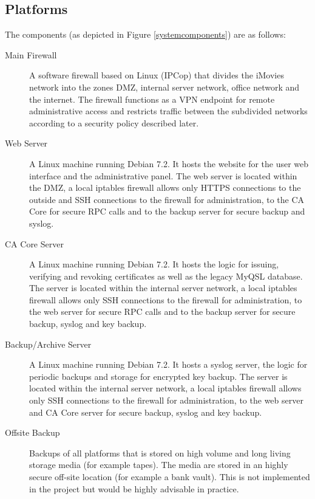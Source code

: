 \documentclass[a4paper, toc=index, 12pt, DIV14, twoside, BCOR2cm, headsepline, numbers=noenddot, bibliography=totoc]{report}
\begin{document}
\subsection{Platforms}
The components (as depicted in Figure \ref{systemcomponents}) are as follows:
\begin{description}
\item[Main Firewall ] A software firewall based on Linux (IPCop) that divides the iMovies network into the zones DMZ, internal server network, office network and the internet. The firewall functions as a VPN endpoint for remote administrative access and restricts traffic between the subdivided networks according to a security policy described later.

\item[Web Server ] A Linux machine running Debian 7.2. It hosts the website for the user web interface and the administrative panel. The web server is located within the DMZ, a local iptables firewall allows only HTTPS connections to the outside and SSH connections to the firewall for administration, to the CA Core for secure RPC calls and to the backup server for secure backup and syslog.

\item[CA Core Server ] A Linux machine running Debian 7.2. It hosts the logic for issuing, verifying and revoking certificates as well as the legacy MyQSL database. The server is located within the internal server network, a local iptables firewall allows only SSH connections to the firewall for administration, to the web server for secure RPC calls and to the backup server for secure backup, syslog and key backup.

\item[Backup/Archive Server ] A Linux machine running Debian 7.2. It hosts a syslog server, the logic for periodic backups and storage for encrypted key backup. The server is located within the internal server network, a local iptables firewall allows only SSH connections to the firewall for administration, to the web server and CA Core server for secure backup, syslog and key backup.

\item[Offsite Backup ] Backups of all platforms that is stored on high volume and long living storage media (for example tapes). The media are stored in an highly secure off-site location (for example a bank vault). This is not implemented in the project but would be highly advisable in practice.
\end{description}
\end{document}
